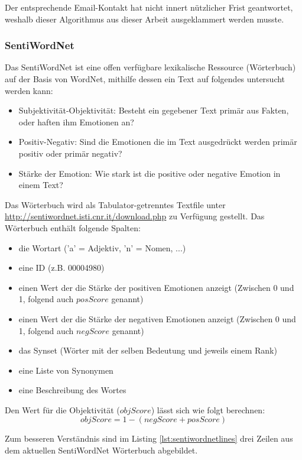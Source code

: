 Der entsprechende Email-Kontakt hat nicht innert nützlicher Frist geantwortet, weshalb dieser Algorithmus aus dieser Arbeit ausgeklammert werden musste.

\subsubsection{SentiWordNet}
Das SentiWordNet ist eine offen verfügbare lexikalische Ressource (Wörterbuch) auf der Basis von WordNet\cite{wordnet}, mithilfe dessen ein Text auf folgendes untersucht werden kann:
\begin{itemize}
\item Subjektivität-Objektivität: Besteht ein gegebener Text primär aus Fakten, oder haften ihm Emotionen an?
\item Positiv-Negativ: Sind die Emotionen die im Text ausgedrückt werden primär positiv oder primär negativ?
\item Stärke der Emotion: Wie stark ist die positive oder negative Emotion in einem Text?
\end{itemize}   
Das Wörterbuch wird als Tabulator-getrenntes Textfile unter \url{http://sentiwordnet.isti.cnr.it/download.php} zu Verfügung gestellt. 
Das Wörterbuch enthält folgende Spalten:
\begin{itemize}
\item die Wortart ('a' = Adjektiv, 'n' = Nomen, ...)
\item eine ID (z.B. 00004980)
\item einen Wert der die Stärke der positiven Emotionen anzeigt (Zwischen 0 und 1, folgend auch $posScore$ genannt)
\item einen Wert der die Stärke der negativen Emotionen anzeigt (Zwischen 0 und 1, folgend auch $negScore$ genannt)
\item das Synset (Wörter mit der selben Bedeutung und jeweils einem \flqq Rank\frqq)
\item eine Liste von Synonymen
\item eine Beschreibung des Wortes
\end{itemize}

Den Wert für die Objektivität ($objScore$) lässt sich wie folgt berechnen: 
\begin{equation}
	objScore = 1-(negScore+posScore)
\end{equation}

Zum besseren Verständnis sind im Listing \ref{lst:sentiwordnetlines} drei Zeilen aus dem aktuellen SentiWordNet Wörterbuch abgebildet.

